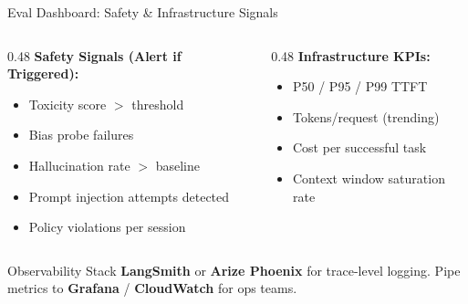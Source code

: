 \documentclass{beamer}       %
\begin{document}
\begin{frame}{Eval Dashboard: Safety \& Infrastructure Signals}
    \small
    \begin{columns}[T]
        \begin{column}{0.48\textwidth}
            \textbf{\color{dangerred} Safety Signals (Alert if Triggered):}
            \begin{itemize}
                \item Toxicity score $>$ threshold
                \item Bias probe failures
                \item Hallucination rate $>$ baseline
                \item Prompt injection attempts detected
                \item Policy violations per session
            \end{itemize}
        \end{column}
        \begin{column}{0.48\textwidth}
            \textbf{\color{accentblue} Infrastructure KPIs:}
            \begin{itemize}
                \item P50 / P95 / P99 TTFT
                \item Tokens/request (trending)
                \item Cost per successful task
                \item Context window saturation rate
            \end{itemize}
        \end{column}
    \end{columns}
    \vfill
    \begin{block}{Observability Stack}
        \small \textbf{LangSmith} or \textbf{Arize Phoenix} for trace-level logging. Pipe metrics to \textbf{Grafana} / \textbf{CloudWatch} for ops teams.
    \end{block}
\end{frame}
\end{document}
